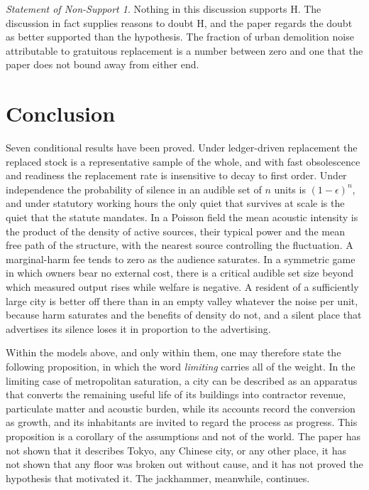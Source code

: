 \documentclass[11pt]{article}
\theoremstyle{definition}
\theoremstyle{remark}
\newtheorem{nonsupport}{Statement of Non-Support}
\begin{document}
\begin{nonsupport}\label{ns:discussion}
Nothing in this discussion supports H. The discussion in fact supplies reasons to doubt H, and the paper regards the doubt as better supported than the hypothesis. The fraction of urban demolition noise attributable to gratuitous replacement is a number between zero and one that the paper does not bound away from either end.
\end{nonsupport}

\section{Conclusion}\label{sec:conclusion}

Seven conditional results have been proved. Under ledger-driven replacement the replaced stock is a representative sample of the whole, and with fast obsolescence and readiness the replacement rate is insensitive to decay to first order. Under independence the probability of silence in an audible set of $n$ units is $(1-\epsilon)^n$, and under statutory working hours the only quiet that survives at scale is the quiet that the statute mandates. In a Poisson field the mean acoustic intensity is the product of the density of active sources, their typical power and the mean free path of the structure, with the nearest source controlling the fluctuation. A marginal-harm fee tends to zero as the audience saturates. In a symmetric game in which owners bear no external cost, there is a critical audible set size beyond which measured output rises while welfare is negative. A resident of a sufficiently large city is better off there than in an empty valley whatever the noise per unit, because harm saturates and the benefits of density do not, and a silent place that advertises its silence loses it in proportion to the advertising.

Within the models above, and only within them, one may therefore state the following proposition, in which the word \emph{limiting} carries all of the weight. In the limiting case of metropolitan saturation, a city can be described as an apparatus that converts the remaining useful life of its buildings into contractor revenue, particulate matter and acoustic burden, while its accounts record the conversion as growth, and its inhabitants are invited to regard the process as progress. This proposition is a corollary of the assumptions and not of the world. The paper has not shown that it describes Tokyo, any Chinese city, or any other place, it has not shown that any floor was broken out without cause, and it has not proved the hypothesis that motivated it. The jackhammer, meanwhile, continues.
\end{document}
